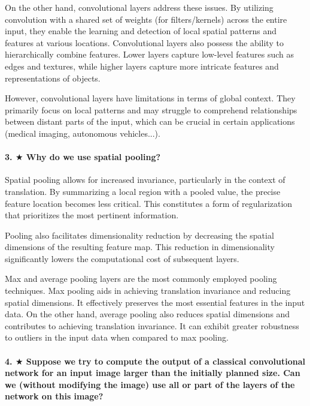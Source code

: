 On the other hand, convolutional layers address these issues. By utilizing convolution with a shared set of weights (for filters/kernels) across the entire input, they enable the learning and detection of local spatial patterns and features at various locations. Convolutional layers also possess the ability to hierarchically combine features. Lower layers capture low-level features such as edges and textures, while higher layers capture more intricate features and representations of objects.

However, convolutional layers have limitations in terms of global context. They primarily focus on local patterns and may struggle to comprehend relationships between distant parts of the input, which can be crucial in certain applications (medical imaging, autonomous vehicles...).

\paragraph{3. $ \bigstar $ Why do we use spatial pooling?}
Spatial pooling allows for increased invariance, particularly in the context of translation. By summarizing a local region with a pooled value, the precise feature location becomes less critical. This constitutes a form of regularization that prioritizes the most pertinent information.

Pooling also facilitates dimensionality reduction by decreasing the spatial dimensions of the resulting feature map. This reduction in dimensionality significantly lowers the computational cost of subsequent layers.

Max and average pooling layers are the most commonly employed pooling techniques. Max pooling aids in achieving translation invariance and reducing spatial dimensions. It effectively preserves the most essential features in the input data. On the other hand, average pooling also reduces spatial dimensions and contributes to achieving translation invariance. It can exhibit greater robustness to outliers in the input data when compared to max pooling.

\paragraph{4. $ \bigstar $ Suppose we try to compute the output of a classical convolutional network for an input image larger than the initially planned size. Can we (without modifying the image) use all or part of the layers of the network on this image?}

